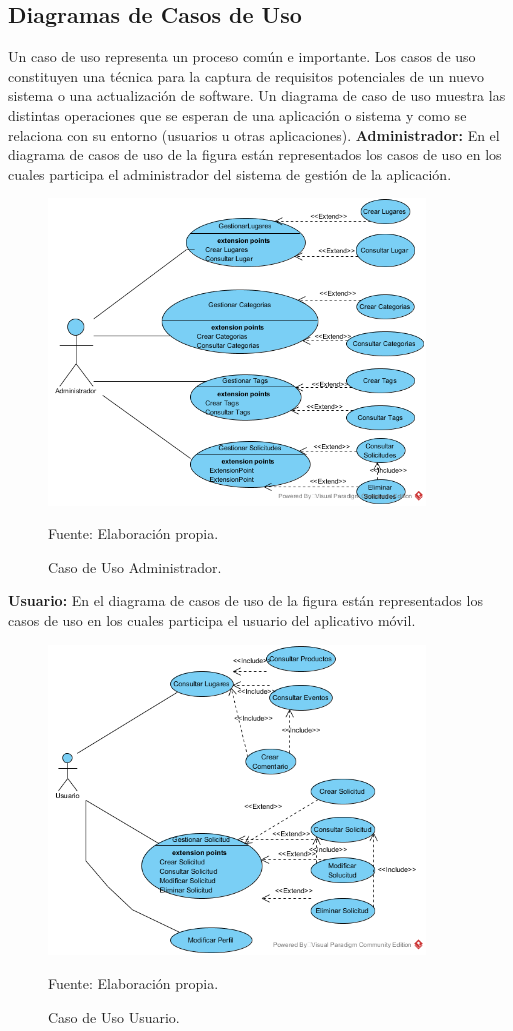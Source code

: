 \documentclass[12pt,letterpaper,openany]{book}
\begin{document}
\subsection{Diagramas de Casos de Uso}
Un caso de uso representa un proceso común e importante. Los casos de uso constituyen una técnica para la captura de requisitos potenciales de un nuevo sistema o una actualización de software. Un diagrama de caso de uso muestra las distintas operaciones que se esperan de una aplicación o sistema y como se relaciona con su entorno (usuarios u otras aplicaciones).
\vspace{5mm}\newline
\textbf{Administrador:} En el diagrama de casos de uso de la figura están representados los casos de uso en los cuales participa el administrador del sistema de gestión de la aplicación.
\begin{figure}[H]
\begin{center}
\includegraphics[width=10cm]{./imagenes/CU/cu_administrador}
\caption{Caso de Uso Administrador.}
\centering Fuente: Elaboración propia.
\end{center}
\end{figure}

\textbf{Usuario:} En el diagrama de casos de uso de la figura están representados los casos de uso en los cuales participa el usuario del aplicativo móvil.
\begin{figure}[H]
\begin{center}
\includegraphics[width=10cm]{./imagenes/CU/cu_usuario}
\caption{Caso de Uso Usuario.}
\centering Fuente: Elaboración propia.
\end{center}
\end{figure}
\end{document}
